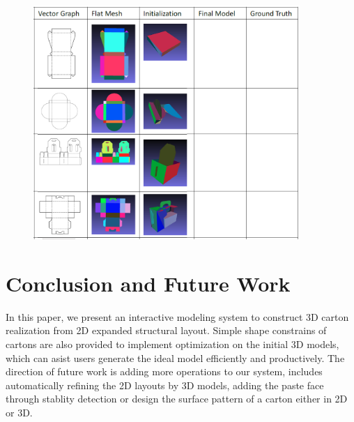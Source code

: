 \documentclass[submission]{gmp2018}
\begin{document}
\begin{figure}
	\centering
	\includegraphics[width=0.9\textwidth]{images/more.png}
	\caption{}
	\label{fig:more}
\end{figure}


\section{Conclusion and Future Work}\label{sec:conclusion}
In this paper, we present an interactive modeling system to construct 3D carton realization from 2D expanded structural layout. Simple shape constrains of cartons are also provided to implement optimization on the initial 3D models, which can asist users generate the ideal model efficiently and productively. The direction of future work is adding more operations to our system, includes automatically refining the 2D layouts by 3D models, adding the paste face through stablity detection or design the surface pattern of a carton either in 2D or 3D. 


\end{document}
